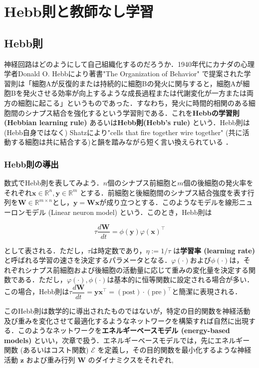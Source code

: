 \section{Hebb則と教師なし学習}
\subsection{Hebb則}
神経回路はどのようにして自己組織化するのだろうか．1940年代にカナダの心理学者Donald O. Hebbにより著書"The Organization of Behavior"\cite{Hebb1949-iv} で提案された学習則は「細胞Aが反復的または持続的に細胞Bの発火に関与すると，細胞Aが細胞Bを発火させる効率が向上するような成長過程または代謝変化が一方または両方の細胞に起こる」というものであった．すなわち，発火に時間的相関のある細胞間のシナプス結合を強化するという学習則である．これを\textbf{Hebbの学習則 (Hebbian learning rule)} あるいは\textbf{Hebb則(Hebb's rule)} という．Hebb則は (Hebb自身ではなく) Shatzにより"cells that fire together wire together" (共に活動する細胞は共に結合する)と韻を踏みながら短く言い換えられている \cite{Shatz1992-he}．

\subsubsection{Hebb則の導出}
数式でHebb則を表してみよう．$n$個のシナプス前細胞と$m$個の後細胞の発火率をそれぞれ$\mathbf{x}\in \mathbb{R}^n, \mathbf{y}\in \mathbb{R}^m$ とする．前細胞と後細胞間のシナプス結合強度を表す行列を$\mathbf{W}\in \mathbb{R}^{m\times n}$とし，$\mathbf{y}=\mathbf{W}\mathbf{x}$が成り立つとする．このようなモデルを線形ニューロンモデル (Linear neuron model) という．このとき，Hebb則は


\begin{equation}
\tau\frac{d\mathbf{W}}{dt}=\phi(\mathbf{y})\varphi(\mathbf{x})^\top
\end{equation}


として表される．ただし，$\tau$は時定数であり，$\eta:=1/\tau$ は\textbf{学習率 (learning rate)} と呼ばれる学習の速さを決定するパラメータとなる．$\varphi(\cdot)$および$\phi(\cdot)$は，それぞれシナプス前細胞および後細胞の活動量に応じて重みの変化量を決定する関数である．ただし，$\varphi(\cdot), \phi(\cdot)$は基本的に恒等関数に設定される場合が多い．この場合，Hebb則は$
\tau\dfrac{d\mathbf{W}}{dt}=\mathbf{y}\mathbf{x}^\top=(\text{post})\cdot (\text{pre})^\top
$と簡潔に表現される．

このHebb則は数学的に導出されたものではないが，特定の目的関数を神経活動及び重みを変化させて最適化するようなネットワークを構築すれば自然に出現する．このようなネットワークを\textbf{エネルギーベースモデル (energy-based models)} といい，次章で扱う．エネルギーベースモデルでは，先にエネルギー関数 (あるいはコスト関数) $\mathcal{E}$ を定義し，その目的関数を最小化するような神経活動 $\mathbf{z}$ および重み行列 $\mathbf{W}$ のダイナミクスをそれぞれ,


